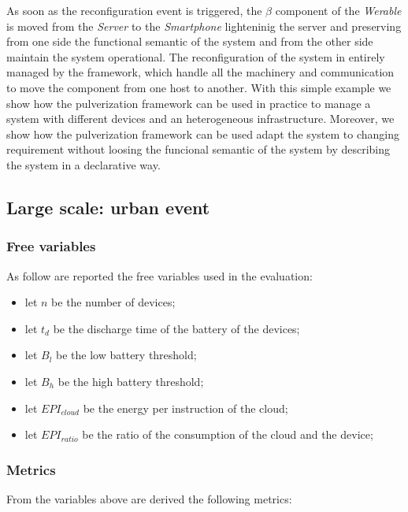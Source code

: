 \documentclass[conference]{IEEEtran}
\begin{document}
As soon as the reconfiguration event is triggered, the $\beta$ component of the \emph{Werable} is moved from the \emph{Server} to the \emph{Smartphone}
lighteninig the server and preserving from one side the functional semantic of the system and from the other side maintain the system operational.
%
The reconfiguration of the system in entirely managed by the framework, which handle all the machinery and communication to move the component from
one host to another.
%
With this simple example we show how the pulverization framework can be used in practice to manage a system with different devices and an heterogeneous
infrastructure.
%
Moreover, we show how the pulverization framework can be used adapt the system to changing requirement without loosing the funcional semantic of the system
by describing the system in a declarative way.

\subsection{Large scale: urban event}

\cite{PianiniJOS2013}

\subsubsection{Free variables}

As follow are reported the free variables used in the evaluation:
\begin{itemize}
    \item let $n$ be the number of devices;
    \item let $t_d$ be the discharge time of the battery of the devices;
    \item let $B_l$ be the low battery threshold;
    \item let $B_h$ be the high battery threshold;
    \item let $EPI_{cloud}$ be the energy per instruction of the cloud;
    \item let $EPI_{ratio}$ be the ratio of the consumption of the cloud and the device;
\end{itemize}

\subsubsection{Metrics}

From the variables above are derived the following metrics:
\end{document}
